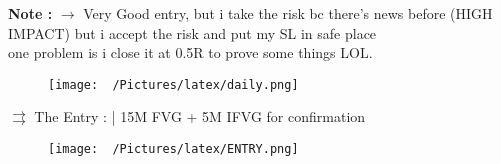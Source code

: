 \documentclass{article}
\begin{document}
\begin{center}
\begin{mdframed}[style=MyQuoteFrame]
  \textbf{Note :} $\rightarrow$ Very Good entry, but i take the risk bc there's news before (HIGH IMPACT) but i accept the risk and put my SL in safe place \\
  one problem is i close it at 0.5R to prove some things LOL.
\end{mdframed}
\end{center}
\vspace{0.2cm}
\newpage

\centering
\vspace{0.1cm}
\begin{figure}[h!]
\begin{adjustbox}{width=1.1\textwidth,center}
  \texttt{[image: ~/Pictures/latex/daily.png]}
\end{adjustbox}
  \label{fig:image}
\end{figure}



\noindent \( \rightrightarrows \) \hspace{0.1cm}The Entry : |  15M FVG + 5M IFVG for confirmation
\begin{figure}[h!]
  \begin{adjustbox}{width=1.1\textwidth,center}
  \texttt{[image: ~/Pictures/latex/ENTRY.png]}
\end{adjustbox}
\label{fig:image}
\end{figure}
\end{document}
